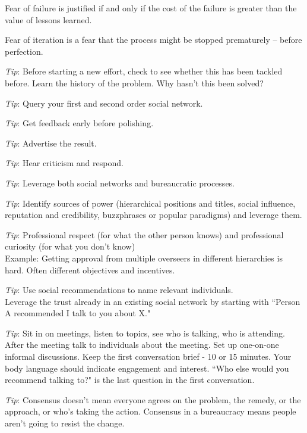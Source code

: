 Fear of failure is justified if and only if the cost of the failure is greater than the value of lessons learned.

Fear of iteration is a fear that the process might be stopped prematurely -- before perfection.

\textit{Tip}: Before starting a new effort, check to see whether this has been tackled before.
Learn the history of the problem. Why hasn't this been solved?

\textit{Tip}: Query your first and second order social network.

\textit{Tip}: Get feedback early before polishing.

\textit{Tip}: Advertise the result.

\textit{Tip}: Hear criticism and respond.

\textit{Tip}: Leverage both social networks and bureaucratic processes. 

\textit{Tip}: Identify sources of power (hierarchical positions and titles, social influence, reputation and credibility, buzzphrases or popular paradigms) and leverage them.

\textit{Tip}: Professional respect (for what the other person knows) and professional curiosity (for what you don't know) \\
Example: Getting approval from multiple overseers in different hierarchies is hard. Often different objectives and incentives.

\textit{Tip}: Use social recommendations to name relevant individuals.\\
Leverage the trust already in an existing social network by starting with ``Person A recommended I talk to you about X."

\textit{Tip}: Sit in on meetings, listen to topics, see who is talking, who is attending. After the meeting talk to individuals about the meeting. Set up one-on-one informal discussions. Keep the first conversation  brief - 10 or 15 minutes. Your body language should indicate engagement and interest. ``Who else would you recommend talking to?" is the last question in the first conversation.


\textit{Tip}: Consensus doesn't mean everyone agrees on the problem, the remedy, or the approach, or who's taking the action. Consensus in a bureaucracy means people aren't going to resist the change.